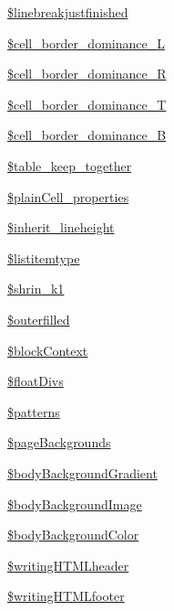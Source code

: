 \begin{DoxyCompactItemize}
\item 
\hyperlink{classm_p_d_f_ae09aaace09e271fab6b35a6df66c5fa4}{\$linebreakjustfinished}
\item 
\hyperlink{classm_p_d_f_a119971113d4bbce717d337f72c0d10f6}{\$cell\-\_\-border\-\_\-dominance\-\_\-\-L}
\item 
\hyperlink{classm_p_d_f_a7ba255757d98b65efdeb752b887adcbb}{\$cell\-\_\-border\-\_\-dominance\-\_\-\-R}
\item 
\hyperlink{classm_p_d_f_a324ae1ed91f3df8da964ac7d14840397}{\$cell\-\_\-border\-\_\-dominance\-\_\-\-T}
\item 
\hyperlink{classm_p_d_f_a1d7b7b6e4f6d771717c6b794ffe505d1}{\$cell\-\_\-border\-\_\-dominance\-\_\-\-B}
\item 
\hyperlink{classm_p_d_f_a03e66eea103428fe47f303f36113348e}{\$table\-\_\-keep\-\_\-together}
\item 
\hyperlink{classm_p_d_f_a5622f7ffc1f77cd4e0554a3d4a6df7d0}{\$plain\-Cell\-\_\-properties}
\item 
\hyperlink{classm_p_d_f_ad05e3337849adc4c251ca8768dc290da}{\$inherit\-\_\-lineheight}
\item 
\hyperlink{classm_p_d_f_afe458ec835625d098a11ef7e19e33eca}{\$listitemtype}
\item 
\hyperlink{classm_p_d_f_a9fa72f4c4e194fc90de618376487cdbc}{\$shrin\-\_\-k1}
\item 
\hyperlink{classm_p_d_f_ae5552f3985dda72a368bd161a660401f}{\$outerfilled}
\item 
\hyperlink{classm_p_d_f_aeb8bf2e8132366c2524ad737f728346c}{\$block\-Context}
\item 
\hyperlink{classm_p_d_f_ae99e2e671d82f7c47bf570dcbb865ecc}{\$float\-Divs}
\item 
\hyperlink{classm_p_d_f_a24ef23874090c250a7ece9fa437f0cc0}{\$patterns}
\item 
\hyperlink{classm_p_d_f_aa0ebc85162d4388a9d02677b6c4d416d}{\$page\-Backgrounds}
\item 
\hyperlink{classm_p_d_f_a257ca4fd010273e07b1d10eb3b662bdd}{\$body\-Background\-Gradient}
\item 
\hyperlink{classm_p_d_f_ad9a0ac06604e4bbc503074a38dbb642c}{\$body\-Background\-Image}
\item 
\hyperlink{classm_p_d_f_a701ef2b6bb3e1eda60126f0e9bbd1d37}{\$body\-Background\-Color}
\item 
\hyperlink{classm_p_d_f_a1b327332d853eefc157239bdaa77d15b}{\$writing\-H\-T\-M\-Lheader}
\item 
\hyperlink{classm_p_d_f_a60171c302851f953848b83d7b7020281}{\$writing\-H\-T\-M\-Lfooter}

\end{DoxyCompactItemize}
